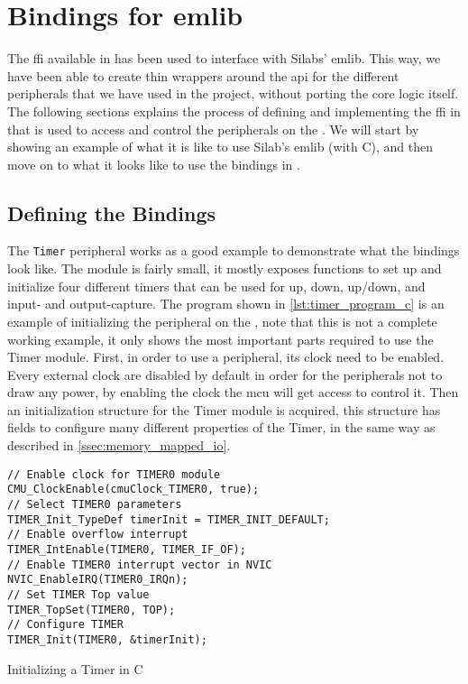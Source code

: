 
\section{Bindings for emlib}
\label{sub:interfacing_with_emlib}

The \gls{ffi} available in {\rust} has been used to interface with Silabs' emlib.
This way, we have been able to create thin wrappers around the \gls{api} for the different peripherals that we have used in the project, without porting the core logic itself.
The following sections explains the process of defining and implementing the \gls{ffi} in {\rust} that is used to access and control the peripherals on the \gecko.
We will start by showing an example of what it is like to use Silab's emlib (with C), and then move on to what it looks like to use the bindings in {\rust}.

\subsection{Defining the Bindings}

The \texttt{Timer} peripheral \cite{an0014_timer} works as a good example to demonstrate what the {\rust} bindings look like.
The module is fairly small, it mostly exposes functions to set up and initialize four different timers that can be used for up, down, up/down, and input- and output-capture.
The program shown in \autoref{lst:timer_program_c} is an example of initializing the  peripheral on the \gecko, note that this is not a complete working example, it only shows the most important parts required to use the Timer module.
First, in order to use a peripheral, its clock need to be enabled.
Every external clock are disabled by default  in order for the peripherals not to draw any power, by enabling the clock the \gls{mcu} will get access to control it.
Then an initialization structure for the Timer module is acquired, this structure has fields to configure many different properties of the Timer, in the same way as described in \autoref{ssec:memory_mapped_io}.

\begin{listing}[h]
\begin{verbatim}
// Enable clock for TIMER0 module
CMU_ClockEnable(cmuClock_TIMER0, true);
// Select TIMER0 parameters
TIMER_Init_TypeDef timerInit = TIMER_INIT_DEFAULT;
// Enable overflow interrupt
TIMER_IntEnable(TIMER0, TIMER_IF_OF);
// Enable TIMER0 interrupt vector in NVIC
NVIC_EnableIRQ(TIMER0_IRQn);
// Set TIMER Top value
TIMER_TopSet(TIMER0, TOP);
// Configure TIMER
TIMER_Init(TIMER0, &timerInit);
\end{verbatim}
\caption{Initializing a Timer in C}
\label{lst:timer_program_c}
\end{listing}

